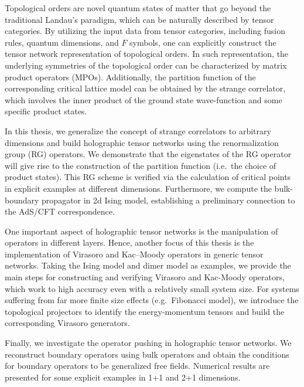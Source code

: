 \begin{abstract*}

Topological orders are novel quantum states of matter that go beyond the traditional Landau's paradigm, which can be naturally described by tensor categories. By utilizing the input data from tensor categories, including fusion rules, quantum dimensions, and $F$ symbols, one can explicitly construct the tensor network representation of topological orders. In such representation, the underlying symmetries of the topological order can be characterized by matrix product operators (MPOs). Additionally, the partition function of the corresponding critical lattice model can be obtained by the strange correlator, which involves the inner product of the ground state wave-function and some specific product states.

In this thesis, we generalize the concept of strange correlators to arbitrary dimensions and build holographic tensor networks using the renormalization group (RG) operators. We demonstrate that the eigenstates of the RG operator will give rise to the construction of the partition function (i.e.\ the choice of product states). This RG scheme is verified via the calculation of critical points in explicit examples at different dimensions. Furthermore, we compute the bulk-boundary propagator in 2d Ising model, establishing a preliminary connection to the AdS/CFT correspondence.

One important aspect of holographic tensor networks is the manipulation of operators in different layers. Hence, another focus of this thesis is the implementation of Virasoro and Kac--Moody operators in generic tensor networks. Taking the Ising model and dimer model as examples, we provide the main steps for constructing and verifying Virasoro and Kac-Moody operators, which work to high accuracy even with a relatively small system size. For systems suffering from far more finite size effects (e.g.\ Fibonacci model), we introduce the topological projectors to identify the energy-momentum tensors and build the corresponding Virasoro generators.

Finally, we investigate the operator pushing in holographic tensor networks. We reconstruct boundary operators using bulk operators and obtain the conditions for boundary operators to be generalized free fields. Numerical results are presented for some explicit examples in 1+1 and 2+1 dimensions.

\end{abstract*}
